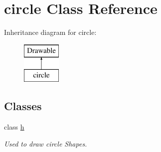 \hypertarget{classcircle}{}\section{circle Class Reference}
\label{classcircle}
Inheritance diagram for circle\+:\begin{figure}[H]
\begin{center}
\leavevmode
\includegraphics[height=2.000000cm]{classcircle}
\end{center}
\end{figure}
\subsection*{Classes}
\begin{DoxyCompactItemize}
\item 
class \mbox{\hyperlink{classcircle_1_1h}{h}}
\begin{DoxyCompactList}\small\item\em Used to draw circle Shapes. \end{DoxyCompactList}\end{DoxyCompactItemize}
